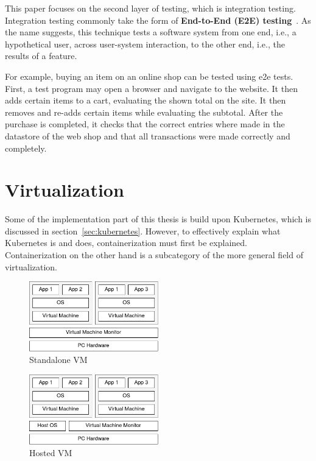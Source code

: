 This paper focuses on the second layer of testing, which is integration testing.
Integration testing commonly take the form of \textbf{End-to-End (E2E) testing}~\cite{end-to-end-integration-testing-design}.
As the name suggests, this technique tests a software system from one end, i.e., a hypothetical user, across user-system interaction, to the other end, i.e., the results of a feature.

For example, buying an item on an online shop can be tested using e2e tests.
First, a test program may open a browser and navigate to the website.
It then adds certain items to a cart, evaluating the shown total on the site.
It then removes and re-adds certain items while evaluating the subtotal.
After the purchase is completed, it checks that the correct entries where made in the datastore of the web shop and that all transactions were made correctly and completely.

\section{Virtualization}\label{sec:virtualization}

Some of the implementation part of this thesis is build upon Kubernetes, which is discussed in section~\ref{sec:kubernetes}.
However, to effectively explain what Kubernetes is and does, containerization must first be explained.
Containerization on the other hand is a subcategory of the more general field of virtualization.

\begin{figure}[H]
    \centering
    \includegraphics[width=0.5\textwidth]{img/background/standalone-vm}
    \caption{Standalone VM~\cite{a-survey-on-virtualization-technologies}}
    \label{fig:standalone-vm}
\end{figure}

\begin{figure}[H]
    \centering
    \includegraphics[width=0.5\textwidth]{img/background/hosted-vm}
    \caption{Hosted VM~\cite{a-survey-on-virtualization-technologies}}
    \label{fig:hosted-vm}
\end{figure}


